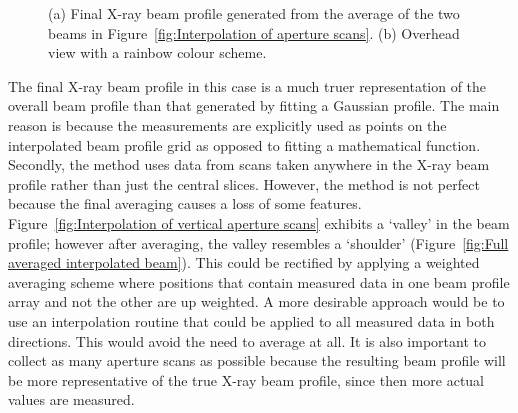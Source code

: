 \begin{figure}
\begin{subfigure}[b]{0.75\textwidth}
            \caption{}
            \label{fig:Overhead averaged interpolated interpolated beam}
    \end{subfigure}
    \caption{(a) Final X-ray beam profile generated from the average of the two beams in Figure~\ref{fig:Interpolation of aperture scans}.
    (b) Overhead view with a rainbow colour scheme.}
    \label{fig:Averaged Beam Profile}
\end{figure}

The final X-ray beam profile in this case is a much truer representation of the overall beam profile than that generated by fitting a Gaussian profile.
The main reason is because the measurements are explicitly used as points on the interpolated beam profile grid as opposed to fitting a mathematical function.
Secondly, the method uses data from scans taken anywhere in the X-ray beam profile rather than just the central slices.
However, the method is not perfect because the final averaging causes a loss of some features.
Figure~\ref{fig:Interpolation of vertical aperture scans} exhibits a `valley' in the beam profile; however after averaging, the valley resembles a `shoulder' (Figure~\ref{fig:Full averaged interpolated beam}).
This could be rectified by applying a weighted averaging scheme where positions that contain measured data in one beam profile array and not the other are up weighted.
A more desirable approach would be to use an interpolation routine that could be applied to all measured data in both directions.
This would avoid the need to average at all.
It is also important to collect as many aperture scans as possible because the resulting beam profile will be more representative of the true X-ray beam profile, since then more actual values are measured.
